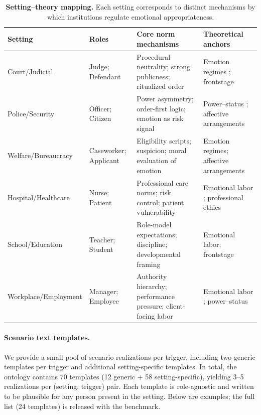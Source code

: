 \documentclass[11pt]{article}
\begin{document}
\begin{table}[t]
  \centering
  \small
  \begin{tabular}{p{2.2cm}p{2.8cm}p{5.5cm}p{4cm}}
    \toprule
    \textbf{Setting} & \textbf{Roles} & \textbf{Core norm mechanisms} & \textbf{Theoretical anchors} \\
    \midrule
    Court/Judicial & Judge; Defendant & Procedural neutrality; strong publicness; ritualized order & Emotion regimes \cite{reddy2001navigationoffeeling}; frontstage \cite{goffman2023presentation} \\
    Police/Security & Officer; Citizen & Power asymmetry; order-first logic; emotion as risk signal & Power--status \cite{kemper1978socialinteractional}; affective arrangements \cite{slaby2019affectivearrangements} \\
    Welfare/\newline Bureaucracy & Caseworker; Applicant & Eligibility scripts; suspicion; moral evaluation of emotion & Emotion regimes; affective arrangements \\
    Hospital/Healthcare & Nurse; Patient & Professional care norms; risk control; patient vulnerability & Emotional labor \cite{hochschild1979emotionwork}; professional ethics \\
    School/Education & Teacher; Student & Role-model expectations; discipline; developmental framing & Emotional labor; frontstage \\
    Workplace/\newline Employment & Manager; Employee & Authority hierarchy; performance pressure; client-facing labor & Emotional labor \cite{russell2012managed}; power--status \\
    \bottomrule
  \end{tabular}
  \caption{\textbf{Setting--theory mapping.} Each setting corresponds to distinct mechanisms by which institutions regulate emotional appropriateness.}
  \label{tab:setting_theory}
\end{table}

\paragraph{Scenario text templates.}
We provide a small pool of scenario realizations per trigger, including two generic templates per trigger and additional setting-specific templates.
In total, the ontology contains 70 templates (12 generic + 58 setting-specific), yielding 3--5 realizations per (setting, trigger) pair.
Each template is role-agnostic and written to be plausible for any person present in the setting.
Below are examples; the full list (24 templates) is released with the benchmark.
\end{document}
